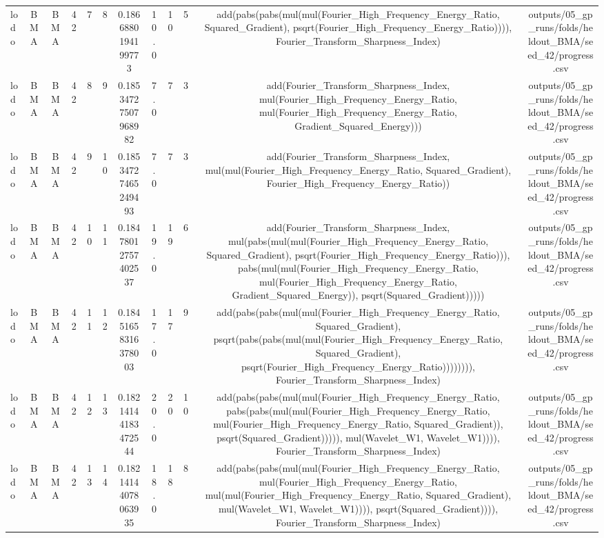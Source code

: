 \begin{table}[t]
\begin{tabular}{lccccccccccc}
lodo & BMA & BMA & 42 & 7 & 8 & 0.1866880194199773 & 10.0 & 10 & 5 & add(pabs(pabs(mul(mul(Fourier\_High\_Frequency\_Energy\_Ratio, Squared\_Gradient), psqrt(Fourier\_High\_Frequency\_Energy\_Ratio)))), Fourier\_Transform\_Sharpness\_Index) & outputs/05\_gp\_runs/folds/heldout\_BMA/seed\_42/progress.csv \\
lodo & BMA & BMA & 42 & 8 & 9 & 0.18534727507968982 & 7.0 & 7 & 3 & add(Fourier\_Transform\_Sharpness\_Index, mul(Fourier\_High\_Frequency\_Energy\_Ratio, mul(Fourier\_High\_Frequency\_Energy\_Ratio, Gradient\_Squared\_Energy))) & outputs/05\_gp\_runs/folds/heldout\_BMA/seed\_42/progress.csv \\
lodo & BMA & BMA & 42 & 9 & 10 & 0.18534727465249493 & 7.0 & 7 & 3 & add(Fourier\_Transform\_Sharpness\_Index, mul(mul(Fourier\_High\_Frequency\_Energy\_Ratio, Squared\_Gradient), Fourier\_High\_Frequency\_Energy\_Ratio)) & outputs/05\_gp\_runs/folds/heldout\_BMA/seed\_42/progress.csv \\
lodo & BMA & BMA & 42 & 10 & 11 & 0.18478012757402537 & 19.0 & 19 & 6 & add(Fourier\_Transform\_Sharpness\_Index, mul(pabs(mul(mul(Fourier\_High\_Frequency\_Energy\_Ratio, Squared\_Gradient), psqrt(Fourier\_High\_Frequency\_Energy\_Ratio))), pabs(mul(mul(Fourier\_High\_Frequency\_Energy\_Ratio, mul(Fourier\_High\_Frequency\_Energy\_Ratio, Gradient\_Squared\_Energy)), psqrt(Squared\_Gradient))))) & outputs/05\_gp\_runs/folds/heldout\_BMA/seed\_42/progress.csv \\
lodo & BMA & BMA & 42 & 11 & 12 & 0.18451658316378003 & 17.0 & 17 & 9 & add(pabs(pabs(mul(mul(Fourier\_High\_Frequency\_Energy\_Ratio, Squared\_Gradient), psqrt(pabs(pabs(mul(mul(Fourier\_High\_Frequency\_Energy\_Ratio, Squared\_Gradient), psqrt(Fourier\_High\_Frequency\_Energy\_Ratio)))))))), Fourier\_Transform\_Sharpness\_Index) & outputs/05\_gp\_runs/folds/heldout\_BMA/seed\_42/progress.csv \\
lodo & BMA & BMA & 42 & 12 & 13 & 0.18214144183472544 & 20.0 & 20 & 10 & add(pabs(pabs(mul(mul(Fourier\_High\_Frequency\_Energy\_Ratio, pabs(pabs(mul(mul(Fourier\_High\_Frequency\_Energy\_Ratio, mul(Fourier\_High\_Frequency\_Energy\_Ratio, Squared\_Gradient)), psqrt(Squared\_Gradient))))), mul(Wavelet\_W1, Wavelet\_W1)))), Fourier\_Transform\_Sharpness\_Index) & outputs/05\_gp\_runs/folds/heldout\_BMA/seed\_42/progress.csv \\
lodo & BMA & BMA & 42 & 13 & 14 & 0.18214144078063935 & 18.0 & 18 & 8 & add(pabs(pabs(mul(mul(Fourier\_High\_Frequency\_Energy\_Ratio, mul(Fourier\_High\_Frequency\_Energy\_Ratio, mul(mul(Fourier\_High\_Frequency\_Energy\_Ratio, Squared\_Gradient), mul(Wavelet\_W1, Wavelet\_W1)))), psqrt(Squared\_Gradient)))), Fourier\_Transform\_Sharpness\_Index) & outputs/05\_gp\_runs/folds/heldout\_BMA/seed\_42/progress.csv \\

\end{tabular}
\end{table}
